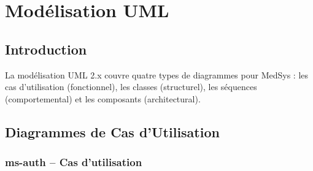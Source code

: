 \chapter{Modélisation UML}

\section{Introduction}

La modélisation UML 2.x couvre quatre types de diagrammes pour MedSys :
les cas d'utilisation (fonctionnel), les classes (structurel),
les séquences (comportemental) et les composants (architectural).

\section{Diagrammes de Cas d'Utilisation}

\subsection{ms-auth -- Cas d'utilisation}

